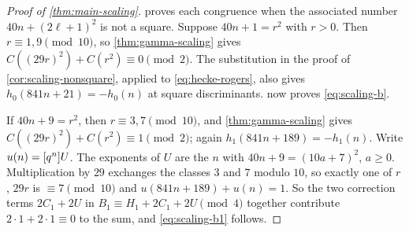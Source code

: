 \begin{proof}[Proof of \cref{thm:main-scaling}]
 proves each congruence when the associated number
$40n+(2\ell+1)^2$ is not a square. Suppose $40n+1=r^2$ with $r>0$. Then
$r\equiv1,9\pmod{10}$, so \cref{thm:gamma-scaling} gives
$C((29r)^2)+C(r^2)\equiv0\pmod2$. The substitution in the proof of
\cref{cor:scaling-nonsquare}, applied to \eqref{eq:hecke-rogers}, also gives
$h_0(841n+21)=-h_0(n)$ at square discriminants.  now proves
\eqref{eq:scaling-b}.

If $40n+9=r^2$, then $r\equiv3,7\pmod{10}$, and \cref{thm:gamma-scaling} gives
$C((29r)^2)+C(r^2)\equiv1\pmod2$; again $h_1(841n+189)=-h_1(n)$. Write
$u(n)=[q^{n}]U$. The exponents of $U$ are the $n$ with $40n+9=(10a+7)^2$, $a\ge0$.
Multiplication by $29$ exchanges the classes $3$ and $7$ modulo $10$, so exactly one of
$r$, $29r$ is $\equiv7\pmod{10}$ and $u(841n+189)+u(n)=1$. So the two correction terms
$2C_1+2U$ in $B_1\equiv H_1+2C_1+2U\pmod4$ together contribute $2\cdot1+2\cdot1\equiv0$
to the sum, and \eqref{eq:scaling-b1} follows.
\end{proof}
